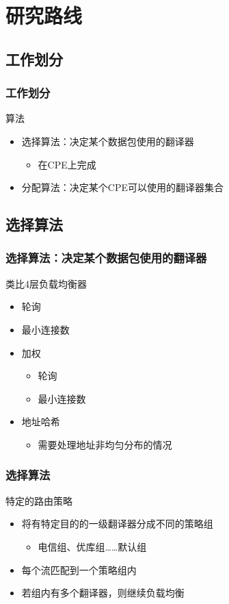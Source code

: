 \documentclass{beamer}
\begin{document}
\section{研究路线}
\subsection{工作划分}

\begin{frame}
  \frametitle{工作划分}
  \begin{block}{算法}
    \begin{itemize}
    \item 选择算法：决定某个数据包使用的翻译器
      \begin{itemize}
      \item 在CPE上完成
      \end{itemize}
    \item 分配算法：决定某个CPE可以使用的翻译器集合
    \end{itemize}
  \end{block}
\end{frame}

\subsection{选择算法}

\begin{frame}
  \frametitle{选择算法：决定某个数据包使用的翻译器}
  \begin{block}{类比4层负载均衡器}
    \begin{itemize}
    \item 轮询
    \item 最小连接数
    \item 加权
      \begin{itemize}
      \item 轮询
      \item 最小连接数
      \end{itemize}
    \item 地址哈希
      \begin{itemize}
      \item 需要处理地址非均匀分布的情况
      \end{itemize}
    \end{itemize}
  \end{block}
\end{frame}

\begin{frame}
  \frametitle{选择算法}
  \begin{block}{特定的路由策略}
  \begin{itemize}
  \item 将有特定目的的一级翻译器分成不同的策略组
    \begin{itemize}
    \item 电信组、优库组……默认组
    \end{itemize}
  \item 每个流匹配到一个策略组内
  \item 若组内有多个翻译器，则继续负载均衡
  \end{itemize}
  \end{block}
\end{frame}
\end{document}
